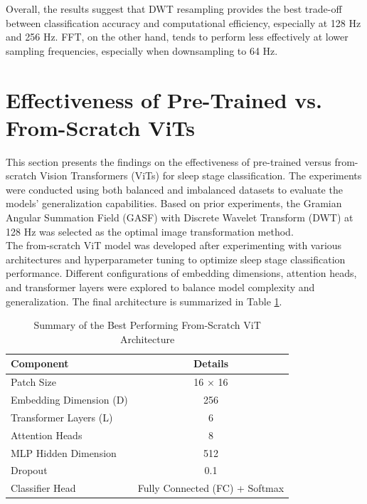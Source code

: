 Overall, the results suggest that DWT resampling provides the best trade-off between classification accuracy and computational efficiency, especially at 128 Hz and 256 Hz. FFT, on the other hand, tends to perform less effectively at lower sampling frequencies, especially when downsampling to 64 Hz.



\section{Effectiveness of Pre-Trained vs. From-Scratch ViTs}

This section presents the findings on the effectiveness of pre-trained versus from-scratch Vision Transformers (ViTs) for sleep stage classification. The experiments were conducted using both balanced and imbalanced datasets to evaluate the models’ generalization capabilities. Based on prior experiments, the Gramian Angular Summation Field (GASF) with Discrete Wavelet Transform (DWT) at 128 Hz was selected as the optimal image transformation method. \\ 

The from-scratch ViT model was developed after experimenting with various architectures and hyperparameter tuning to optimize sleep stage classification performance. Different configurations of embedding dimensions, attention heads, and transformer layers were explored to balance model complexity and generalization. The final architecture is summarized in Table \ref{tab:best_from_scratch}. \\

\begin{table}[H]
    \centering
    \begin{tabular}{l c}
        \toprule
        \textbf{Component} & \textbf{Details} \\
        \midrule
        Patch Size & 16 × 16 \\
        Embedding Dimension (D) & 256 \\
        Transformer Layers (L) & 6 \\
        Attention Heads & 8 \\
        MLP Hidden Dimension & 512 \\
        Dropout & 0.1 \\
        Classifier Head & Fully Connected (FC) + Softmax \\
        \bottomrule
    \end{tabular}
    \caption{ Summary of the Best Performing From-Scratch ViT Architecture}
    \label{tab:best_from_scratch}
\end{table}


